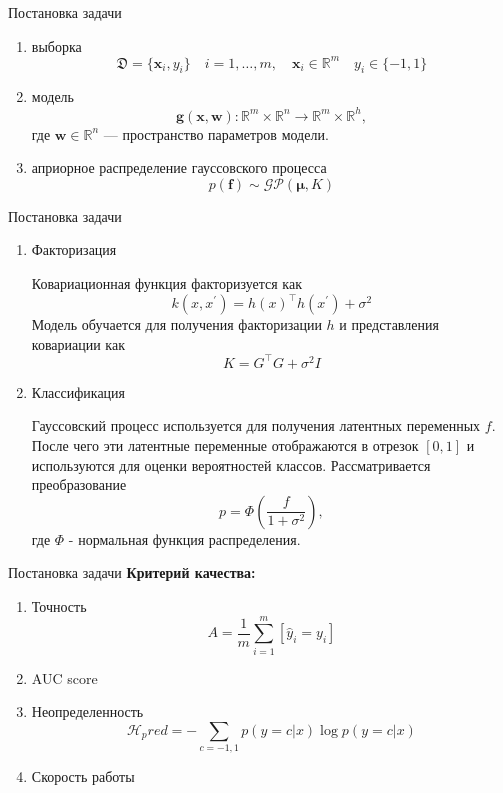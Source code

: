 \documentclass[hyperref={unicode}]{beamer}
\begin{document}
\begin{frame}{Постановка задачи}
    \begin{enumerate}
        \item выборка 
    $$\mathfrak{D} = \{ \mathbf{x}_i, y_i\} \quad i = 1,\dots, m, \quad \mathbf{x}_i \in \mathbb{R}^m \quad y_i \in \{-1,1\} $$
        \item модель
    $$\mathbf{g}(\mathbf{x},\mathbf{w}):\mathbb{R}^m \times \mathbb{R}^n \longrightarrow\mathbb{R}^m \times \mathbb{R}^h,$$
     где $\mathbf{w} \in \mathbb{R}^n$ --- пространство параметров модели.
        \item априорное распределение гауссовского процесса 
    $$p(\mathbf{f}) \sim \mathcal{GP} (\boldsymbol{\mu}, K)$$
    \end{enumerate}
\end{frame}
\begin{frame}{Постановка задачи}
    \begin{enumerate}
        \item Факторизация
        
        Ковариационная функция факторизуется как
        $$k(x, x^') = h(x)^\top h(x^') + \sigma^2$$
        Модель обучается для получения факторизации $h$ и представления ковариации как 
        $$K = G^\top G + \sigma^2 I$$
        \item Классификация
        
        Гауссовский процесс используется для получения латентных переменных $f$. После чего эти латентные переменные отображаются в отрезок $[0,1]$ и используются для оценки вероятностей классов. Рассматривается преобразование 
        $$ p = \Phi(\frac{f}{1 + \sigma^2}),$$
        где $\Phi$ - нормальная функция распределения.
        \end{enumerate}
\end{frame}


\begin{frame}{Постановка задачи}
\textbf{Критерий качества:} 
\begin{enumerate}
    \item Точность 
    $$A = \frac{1}{m}\sum\limits_{i=1}^m [\hat{y}_i = y_i] $$
    \item AUC score
    \item Неопределенность
    $$\mathcal{H}_pred = -\sum\limits_{c = -1,1} p(y=c|x) \log p(y=c|x)$$
    \item Скорость работы
\end{enumerate}
\end{frame}
\end{document}
